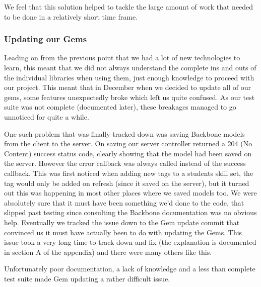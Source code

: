     We feel that this solution helped to tackle the large amount of work that needed to be done in a relatively short time frame.
  \subsubsection{Updating our Gems}
    Leading on from the previous point that we had a lot of new technologies to learn, this meant that we did not always understand the complete ins and outs of the individual libraries when using them, just enough knowledge to proceed with our project. This meant that in December when we decided to update all of our gems, some features unexpectedly broke which left us quite confused. As our test suite was not complete (documented later), these breakages managed to go unnoticed for quite a while.

    One such problem that was finally tracked down was saving Backbone models from the client to the server. On saving our server controller returned a 204 (No Content) success status code, clearly showing that the model had been saved on the server. However the error callback was always called instead of the success callback. This was first noticed when adding new tags to a students skill set, the tag would only be added on refresh (since it saved on the server), but it turned out this was happening in most other places where we saved models too.
    We were absolutely sure that it must have been something we'd done to the code, that slipped past testing since consulting the Backbone documentation was no obvious help. Eventually we tracked the issue down to the Gem update commit that convinced us it must have actually been to do with updating the Gems.
    This issue took a very long time to track down and fix (the explanation is documented in section A of the appendix) and there were many others like this.

    Unfortunately poor documentation, a lack of knowledge and a less than complete test suite made Gem updating a rather difficult issue.
